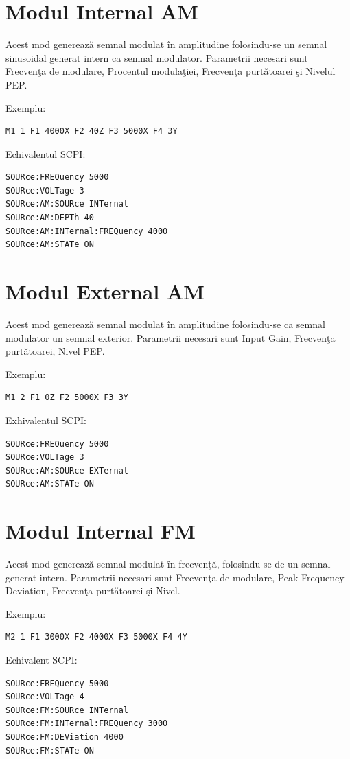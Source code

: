 \section{Modul Internal AM}
Acest mod genereaz\u{a} semnal modulat \^{i}n amplitudine folosindu-se un semnal sinusoidal generat intern ca semnal modulator. Parametrii necesari sunt Frecven\c{t}a de modulare, Procentul modula\c{t}iei, Frecven\c{t}a purt\u{a}toarei \c{s}i Nivelul PEP.

Exemplu:
\begin{verbatim}
M1 1 F1 4000X F2 40Z F3 5000X F4 3Y
\end{verbatim}

Echivalentul SCPI:
\begin{verbatim}
SOURce:FREQuency 5000
SOURce:VOLTage 3
SOURce:AM:SOURce INTernal
SOURce:AM:DEPTh 40
SOURce:AM:INTernal:FREQuency 4000
SOURce:AM:STATe ON
\end{verbatim}

\section{Modul External AM}
Acest mod genereaz\u{a} semnal modulat \^{i}n amplitudine folosindu-se ca semnal modulator un semnal exterior. Parametrii necesari sunt Input Gain, Frecven\c{t}a purt\u{a}toarei, Nivel PEP.

Exemplu:
\begin{verbatim}
M1 2 F1 0Z F2 5000X F3 3Y
\end{verbatim}

Exhivalentul SCPI:
\begin{verbatim}
SOURce:FREQuency 5000
SOURce:VOLTage 3
SOURce:AM:SOURce EXTernal
SOURce:AM:STATe ON
\end{verbatim}

\section{Modul Internal FM}
Acest mod genereaz\u{a} semnal modulat \^{i}n frecven\c{t}\u{a}, folosindu-se de un semnal generat intern. Parametrii necesari sunt Frecven\c{t}a de modulare, Peak Frequency Deviation, Frecven\c{t}a purt\u{a}toarei \c{s}i Nivel.

Exemplu:
\begin{verbatim}
M2 1 F1 3000X F2 4000X F3 5000X F4 4Y
\end{verbatim}

Echivalent SCPI:
\begin{verbatim}
SOURce:FREQuency 5000
SOURce:VOLTage 4
SOURce:FM:SOURce INTernal
SOURce:FM:INTernal:FREQuency 3000
SOURce:FM:DEViation 4000
SOURce:FM:STATe ON
\end{verbatim}

